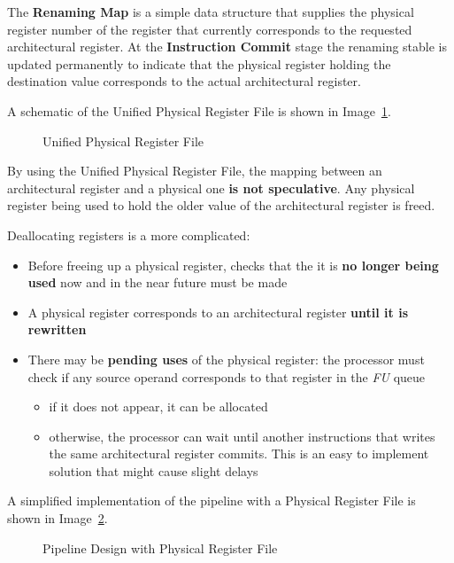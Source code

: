 \documentclass[english]{article}
\begin{document}
The \textbf{Renaming Map} is a  simple data structure that supplies the physical register number of the register that currently corresponds to the requested architectural register.
At the \textbf{Instruction Commit} stage the renaming stable is updated permanently to indicate that the physical register holding the destination value corresponds to the actual architectural register.

A schematic of the Unified Physical Register File is shown in Image~\ref{fig:unified-physical-register-file}.

\begin{figure}[htbp]
  \bigskip
  \centering
  \caption{Unified Physical Register File}
  \label{fig:unified-physical-register-file}
  \bigskip
\end{figure}

\bigskip
By using the Unified Physical Register File, the mapping between an architectural register and a physical one \textbf{is not speculative}.
Any physical register being used to hold the older value of the architectural register is freed.

Deallocating registers is a more complicated:

\begin{itemize}
  \item Before freeing up a physical register, checks that the it is \textbf{no longer being used} now and in the near future must be made
  \item A physical register corresponds to an architectural register \textbf{until it is rewritten}
  \item There may be \textbf{pending uses} of the physical register: the processor must check if any source operand corresponds to that register in the \textit{FU} queue
        \begin{itemize}
          \item if it does not appear, it can be allocated
          \item otherwise, the processor can wait until another instructions that writes the same architectural register commits. This is an easy to implement solution that might cause slight delays
        \end{itemize}
\end{itemize}

A simplified implementation of the pipeline with a Physical Register File is shown in Image~\ref{fig:pipeline-design-with-physical-register-file}.

\begin{figure}[htbp]
  \bigskip
  \centering
  \caption{Pipeline Design with Physical Register File}
  \label{fig:pipeline-design-with-physical-register-file}
  \bigskip
\end{figure}
\end{document}

